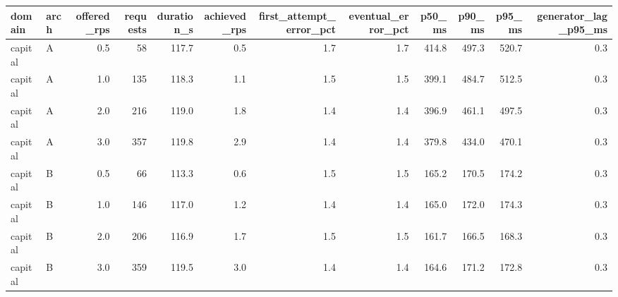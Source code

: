 \begin{tabular}{llrrrrrrrrrr}
\toprule
domain & arch & offered_rps & requests & duration_s & achieved_rps & first_attempt_error_pct & eventual_error_pct & p50_ms & p90_ms & p95_ms & generator_lag_p95_ms \\
\midrule
capital & A & 0.5 & 58 & 117.7 & 0.5 & 1.7 & 1.7 & 414.8 & 497.3 & 520.7 & 0.3 \\
capital & A & 1.0 & 135 & 118.3 & 1.1 & 1.5 & 1.5 & 399.1 & 484.7 & 512.5 & 0.3 \\
capital & A & 2.0 & 216 & 119.0 & 1.8 & 1.4 & 1.4 & 396.9 & 461.1 & 497.5 & 0.3 \\
capital & A & 3.0 & 357 & 119.8 & 2.9 & 1.4 & 1.4 & 379.8 & 434.0 & 470.1 & 0.3 \\
capital & B & 0.5 & 66 & 113.3 & 0.6 & 1.5 & 1.5 & 165.2 & 170.5 & 174.2 & 0.3 \\
capital & B & 1.0 & 146 & 117.0 & 1.2 & 1.4 & 1.4 & 165.0 & 172.0 & 174.3 & 0.3 \\
capital & B & 2.0 & 206 & 116.9 & 1.7 & 1.5 & 1.5 & 161.7 & 166.5 & 168.3 & 0.3 \\
capital & B & 3.0 & 359 & 119.5 & 3.0 & 1.4 & 1.4 & 164.6 & 171.2 & 172.8 & 0.3 \\
\bottomrule
\end{tabular}

